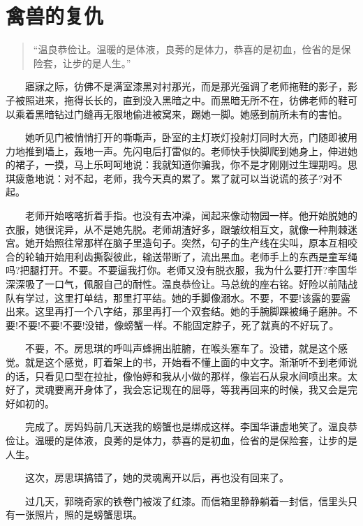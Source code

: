 \documentclass[12pt,UTF8]{ctexbook}
\begin{document}
\hypertarget{ux79bdux517dux7684ux590dux4ec7}{%
\section*{禽兽的复仇}\label{ux79bdux517dux7684ux590dux4ec7}}

\begin{quote}
\enquote{温良恭俭让。温暖的是体液，良莠的是体力，恭喜的是初血，俭省的是保险套，让步的是人生。}
\end{quote}

　　寤寐之际，彷佛不是满室漆黑对衬那光，而是那光强调了老师拖鞋的影子，影子被照进来，拖得长长的，直到没入黑暗之中。而黑暗无所不在，彷佛老师的鞋可以乘着黑暗钻过门缝再无限地偷进被窝来，踢她一脚。她感到前所未有的害怕。

　　她听见门被悄悄打开的嘶嘶声，卧室的主灯崁灯投射灯同时大亮，门随即被用力地推到墙上，轰地一声。先闪电后打雷似的。老师快手快脚爬到她身上，伸进她的裙子，一摸，马上乐呵呵地说：我就知道你骗我，你不是才刚刚过生理期吗。思琪疲惫地说：对不起，老师，我今天真的累了。累了就可以当说谎的孩子?对不起。

　　老师开始喀喀折着手指。也没有去冲澡，闻起来像动物园一样。他开始脱她的衣服，她很诧异，从不是她先脱。老师胡渣好多，跟皱纹相互文，就像一种荆棘迷宫。她开始照往常那样在脑子里造句子。突然，句子的生产线在尖叫，原本互相咬合的轮轴开始用利齿撕裂彼此，输送带断了，流出黑血。老师手上的东西是童军绳吗?把腿打开。不要。不要逼我打你。老师又没有脱衣服，我为什么要打开?李国华深深吸了一口气，佩服自己的耐性。温良恭俭让。马总统的座右铭。好险以前陆战队有学过，这里打单结，那里打平结。她的手脚像溺水。不要，不要!该露的要露出来。这里再打一个八字结，那里再打一个双套结。她的手腕脚踝被绳子磨肿。不要!不要!不要!不要!没错，像螃蟹一样。不能固定脖子，死了就真的不好玩了。

　　不要，不。房思琪的呼叫声蜂拥出脏腑，在喉头塞车了。没错，就是这个感觉。就是这个感觉，盯着架上的书，开始看不懂上面的中文字。渐渐听不到老师说的话，只看见口型在拉扯，像怡婷和我从小做的那样，像岩石从泉水间喷出来。太好了，灵魂要离开身体了，我会忘记现在的屈辱，等我再回来的时候，我又会是完好如初的。

　　完成了。房妈妈前几天送我的螃蟹也是绑成这样。李国华谦虚地笑了。温良恭俭让。温暖的是体液，良莠的是体力，恭喜的是初血，俭省的是保险套，让步的是人生。

　　这次，房思琪搞错了，她的灵魂离开以后，再也没有回来了。

　　过几天，郭晓奇家的铁卷门被泼了红漆。而信箱里静静躺着一封信，信里头只有一张照片，照的是螃蟹思琪。
\end{document}
